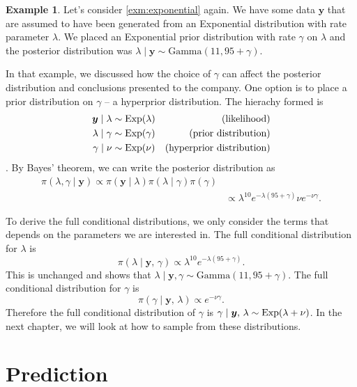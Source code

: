 \documentclass[
]{book}
\theoremstyle{definition}
\theoremstyle{definition}
\newtheorem{example}{Example}[chapter]
\theoremstyle{definition}
\theoremstyle{definition}
\theoremstyle{remark}
\begin{document}
\begin{example}
Let's consider \ref{exm:exponential} again. We have some data \(\boldsymbol{y}\) that are assumed to have been generated from an Exponential distribution with rate parameter \(\lambda\). We placed an Exponential prior distribution with rate \(\gamma\) on \(\lambda\) and the posterior distribution was \(\lambda \mid \boldsymbol{y} \sim \textrm{Gamma}(11, 95 + \gamma)\).

In that example, we discussed how the choice of \(\gamma\) can affect the posterior distribution and conclusions presented to the company. One option is to place a prior distribution on \(\gamma\) -- a hyperprior distribution. The hierachy formed is
\begin{align*}
\boldsymbol{y} \mid \lambda &\sim \hbox{Exp}(\lambda) & \textrm{(likelihood)} \\
\lambda \mid \gamma &\sim \hbox{Exp}(\gamma) & \textrm{(prior distribution)} \\
\gamma \mid \nu &\sim \hbox{Exp}(\nu) & \textrm{(hyperprior distribution)}  \\
\end{align*}.
By Bayes' theorem, we can write the posterior distribution as
\begin{align*}
\pi(\lambda, \gamma \mid \boldsymbol{y}) \propto \pi(\boldsymbol{y} \mid \lambda)\pi(\lambda \mid \gamma)\pi(\gamma)\\
&\propto \lambda^{10}e^{-\lambda(95 + \gamma)}\nu e^{-\nu\gamma}.
\end{align*}

To derive the full conditional distributions, we only consider the terms that depends on the parameters we are interested in. The full conditional distribution for \(\lambda\) is
\[
\pi(\lambda \mid \boldsymbol{y}, \,\gamma) \propto \lambda^{10}e^{-\lambda(95 + \gamma)}.
\]
This is unchanged and shows that \(\lambda \mid \boldsymbol{y}, \gamma \sim \textrm{Gamma}(11, 95 + \gamma)\). The full conditional distribution for \(\gamma\) is
\[
\pi(\gamma \mid \boldsymbol{y}, \,\lambda) \propto e^{-\nu\gamma}.
\]
Therefore the full conditional distribution of \(\gamma\) is \(\gamma \mid \boldsymbol{y}, \,\lambda \sim \hbox{Exp}(\lambda + \nu)\).
In the next chapter, we will look at how to sample from these distributions.
\end{example}

\section{Prediction}\label{prediction}
\end{document}
